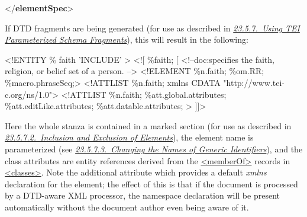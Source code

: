 \begin{shaded}
\mbox{}\newline 
{</\textbf{elementSpec}>}\end{shaded}\egroup\par \noindent  If DTD fragments are being generated (for use as described in \textit{\hyperref[STPE]{23.5.7.\ Using TEI Parameterized Schema Fragments}}), this will result in the following: \par\hfill\bgroup\exampleFont\vskip 10pt\begin{shaded}
\obeyspaces <!ENTITY \% faith 'INCLUDE' >\newline
<![ \%faith; [\newline
\newline
<!--doc:specifies the faith,  religion, or belief set of a person. -->\newline
<!ELEMENT \%n.faith; \%om.RR; \%macro.phraseSeq;>\newline
<!ATTLIST \%n.faith; xmlns CDATA "http://www.tei-c.org/ns/1.0">\newline
<!ATTLIST \%n.faith;\newline
 \%att.global.attributes;\newline
 \%att.editLike.attributes;\newline
 \%att.datable.attributes; >\newline
]]>\end{shaded}
\par\egroup 
 Here the whole stanza is contained in a marked section (for use as described in \textit{\hyperref[STPEEX]{23.5.7.2.\ Inclusion and Exclusion of Elements}}), the element name is parameterized (see \textit{\hyperref[STPEGI]{23.5.7.3.\ Changing the Names of Generic Identifiers}}), and the class attributes are entity references derived from the \hyperref[TEI.memberOf]{<memberOf>} records in \hyperref[TEI.classes]{<classes>}. Note the additional attribute which provides a default {\itshape xmlns} declaration for the element; the effect of this is that if the document is processed by a DTD-aware XML processor, the namespace declaration will be present automatically without the document author even being aware of it.\par
